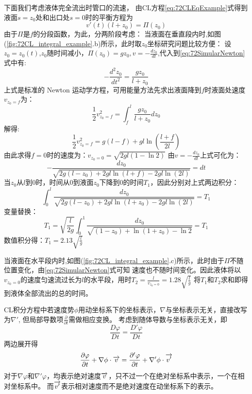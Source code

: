 下面我们考虑液体完全流出时管口的流速，
由CL方程\eqref{eq:72CLEqExample}式得到液面$s=z_0$处和出口处$s=0$时的平衡方程为
\begin{equation}\label{eq:72SimularNewton}
v'(t) (l+z_0)=\Pi(z_0)
\end{equation}
由于$\Pi$是$f$的分段函数，为此，分两阶段考虑：
当液面在垂直段内时,如图(\ref{fig:72CL_integral_example}.b)所示，此时取$z_0$坐标研究问题比较方便：
设$z_0=z_0(t)$,$z_0$随时间减小，$\Pi(z_0)=gz_0,v=-\frac{d z_0}{dt}$,代入到\eqref{eq:72SimularNewton}式中有:
\begin{equation}
-\frac{d^2 z_0}{dt^2} = \frac{g z_0}{l+z_0}
\end{equation}
上式是标准的 Newton 运动学方程，可用能量方法先求出液面降到$f$时液面处速度
$v_{z_0=f}$为：
\begin{equation}
\frac{1}{2}v_{z_0=f}^2=\int_{f}^{l} \frac{g z_0}{l+z_0} dz_0
\end{equation}
解得:
\begin{equation}
\frac{1}{2}v^2_{z_0=f}=g(l-f)+gl\ln \left(\frac{l+f}{2l}\right)
\end{equation}
由此求得$f=0$时的速度为：$v_{z_0=0}=\sqrt{2gl(1-\ln 2)}$
由$v=-\frac{d z_0}{dt}$上式可化为：
\begin{equation}
-\frac{d z_0}{\sqrt{2g(l-z_0)+2gl\ln(l+f)-2gl\ln(2l)}}=dt
\end{equation}
当$z_0$从$l$到$0$时，时间从$0$到液面$z_0$下降到0的时间$T_1$，因此分别对上式两边积分：
\begin{equation}
\int_0^l \frac{d z_0}{\sqrt{2g(l-z_0)+2gl\ln(l+z_0)-2gl\ln(2l)}}=T_1
\end{equation}
变量替换：
\begin{equation}
T_1=\sqrt{\frac{l}{2g}}\int_0^1 \frac{d z_0}{\sqrt{(1-z_0)+\ln(1+z_0)-\ln 2}}=T_1
\end{equation}
数值积分得：$T_1=2.13\sqrt{\frac{l}{g}}$

当液面在水平段内时,如图(\ref{fig:72CL_integral_example}.c)所示，此时由于$\Pi$不随位置变化，由\eqref{eq:72SimularNewton}式可知
速度也不随时间变化。因此液体将以$v_{z_0=0}$的速度匀速流过长为$l$的水平段，用时$T_2=\frac{l}{v_{z_0=0}}=1.28\sqrt{\frac{l}{g}}$
将$T_1$和$T_2$求和即得到液体全部流出的总的时间。

CL积分方程中若速度势$\phi$用动坐标系下的坐标表示，$\nabla$与坐标表示无关，直接改写为$\nabla'$,
但局部导数项$\frac{\partial}{\partial t}$需做相应变换。
考虑到随体导数与坐标表示无关，即
\begin{equation}
\frac{D\varphi}{Dt}=\frac{D'\varphi}{Dt}
\end{equation}
两边展开得
\begin{equation}
\frac{\partial \varphi}{\partial t}+\nabla \phi \cdot \overrightarrow{v}=\frac{\partial' \varphi}{\partial t}+\nabla' \phi \cdot \overrightarrow{v'}
\end{equation}
对于$\nabla \varphi$和$\nabla' \varphi$，均表示绝对速度$\overrightarrow{v}$，只不过一个在绝对坐标系中表示，一个在相对坐标系中。
而$\overrightarrow{v'}$表示相对速度而不是绝对速度在动坐标系下的表示。

